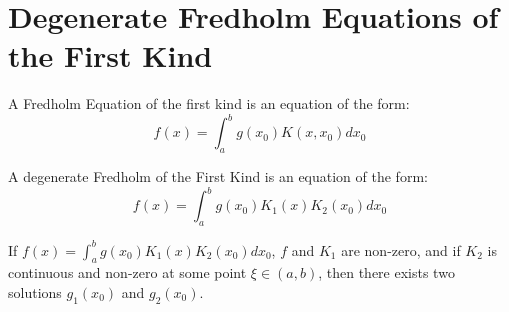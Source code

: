 \documentclass[crop=false,class=book,oneside]{standalone}
\begin{document}
        \section{Degenerate Fredholm Equations of the First Kind}
            \begin{definition}
                A Fredholm Equation of the first kind is an equation
                of the form:
                \begin{equation*}
                    f(x)=\int_{a}^{b}g(x_{0})K(x,x_{0})dx_{0}
                \end{equation*}
            \end{definition}
            \begin{definition}
                A degenerate Fredholm of the First Kind is an
                equation of the form:
                    \begin{equation*}
                        f(x)=\int_{a}^{b}g(x_{0})K_{1}(x)
                             K_{2}(x_{0})dx_{0}
                    \end{equation*}
            \end{definition}
            \begin{theorem}
                If $f(x)=\int_{a}^{b}g(x_{0})K_{1}(x)K_{2}(x_{0})
                dx_{0}$, $f$ and $K_1$ are non-zero,
                and if $K_{2}$ is continuous and non-zero
                at some point $\xi\in(a,b)$,
                then there exists two solutions $g_{1}(x_{0})$ and
                $g_{2}(x_{0})$.
            \end{theorem}
\end{document}
